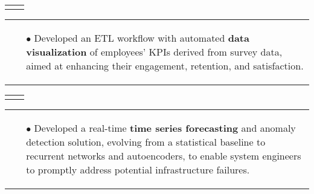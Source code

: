 \documentclass[11pt,a4paper,sans,english]{moderncv}
\makeatletter
\renewcommand*{\cventry}[6][.25em]{%
	\vspace{1.5mm}%
	\begin{tabular*}{\textwidth}{@{\extracolsep{\fill}}ll}%
		\ifthenelse{\equal{#3}{}}{}{\textbf{#3}} &
		\ifthenelse{\equal{#2}{}}{}{#4 #6 #2}\\%
	\end{tabular*}%
	\par\addvspace{#1}}
\newcommand*{\mycvitem}[2][.25em]{%
	\vspace{-.25em}%
	\begin{tabular}{@{}p{\textwidth}@{}}%
		\small#2%
	\end{tabular}%
	\par\addvspace{-0.7em}}
\newcommand*{\cvtag}[1]{%
	\textcolor{lightgray!50!black}{\fbox{\mathstrut\scriptsize\textsf{\textbf{#1}}}}}
\makeatother
\begin{document}
	\cventry{\scalebox{0.9}{\faCalendar\ 10/2022--02/2023}}{Artificial Intelligence and Data - Analyst}{\scalebox{0.9}{\faBuilding\ \href{https://www2.deloitte.com}{\textit{Deloitte}}}}{}{\scalebox{0.9}{\faMapMarker\ Bari}}{}
	\mycvitem{%
		\vspace*{-.6cm}
		\begin{flushleft}
			\noindent
			\cvtag{Qlik Sense} \cvtag{SQL} \cvtag{Pandas} \cvtag{MS Excel} \cvtag{Qlik NPrinting}
		\end{flushleft}
		\vspace*{-.2cm}
		\begin{itemize}
			\item[$\bullet$] Developed an ETL workflow with automated \textbf{data visualization} of employees' KPIs derived from survey data, aimed at enhancing their engagement, retention, and satisfaction.
	\end{itemize}}
	
	\vspace*{.25cm}
	\cventry{\scalebox{0.9}{\faCalendar\ 12/2021--05/2022}}{AI engineer and System Administrator - Intern}{\scalebox{0.9}{\faBuilding\ \href{https://www.intesasanpaolo.com/}{\textit{Intesa Sanpaolo}}}}{}{\scalebox{0.9}{\faMapMarker\ Torino}}{}
	\mycvitem{%
		\vspace*{-.6cm}
		\begin{flushleft}
			\noindent
			\cvtag{Python} \cvtag{TensorFlow} \cvtag{Google Cloud Platform} \cvtag{Flask} \cvtag{Bokeh} \cvtag{Bash}
		\end{flushleft}
		\vspace*{-.2cm}
		\begin{itemize}
			\item[$\bullet$] Developed a real-time \textbf{time series forecasting} and anomaly detection solution, evolving from a statistical baseline to recurrent networks and autoencoders, to enable system engineers to promptly address potential infrastructure failures.
	\end{itemize}}
	
\end{document}

